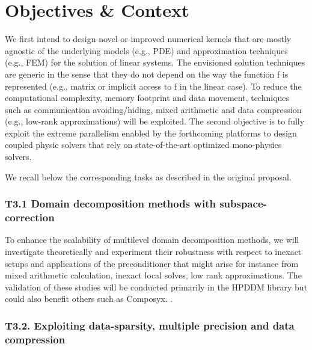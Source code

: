 
\section{Objectives \& Context}

We first intend to design novel or improved numerical kernels that are mostly agnostic of the
underlying models (e.g., PDE) and approximation techniques (e.g., FEM) for the solution of linear
systems. The envisioned solution techniques are generic in the sense that they do not depend on the
way the function f is represented (e.g., matrix or implicit access to f in the linear case). To reduce the
computational complexity, memory footprint and data movement, techniques such as communication
avoiding/hiding, mixed arithmetic and data compression (e.g., low-rank approximations) will be
exploited. The second objective is to fully exploit the extreme parallelism enabled by the forthcoming
platforms to design coupled physic solvers that rely on state-of-the-art optimized mono-physics
solvers.

We recall below the corresponding tasks as described in the original proposal. 



\subsubsection*{T3.1 Domain decomposition methods with subspace-correction}

 To enhance the scalability of
multilevel domain decomposition methods, we will investigate theoretically and experiment their
robustness with respect to inexact setups and applications of the preconditioner that might arise for
instance from mixed arithmetic calculation, inexact local solves, low rank approximations. The
validation of these studies will be conducted primarily in the HPDDM library but could also benefit
others such as Composyx.
.
\subsubsection*{T3.2. Exploiting data-sparsity, multiple precision and data compression}
